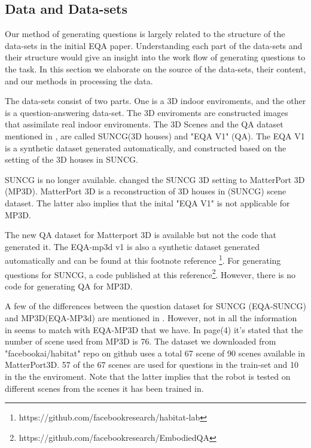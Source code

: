 %
%
%
%



\subsection{Data and Data-sets}

 Our method of generating questions is largely related to the structure of the data-sets in the initial EQA paper\cite{embodiedqa}. Understanding each part of the data-sets and their structure would give an insight into the work flow of generating questions to the task. In this section we elaborate on the source of the data-sets, their content, and our methods in processing the data. 
 
The data-sets consist of two parts. One is a 3D indoor enviroments, and the other is a question-answering data-set. The 3D enviroments are constructed images that assimilate real indoor enviroments. The 3D Scenes and the QA dataset mentioned in \cite{embodiedqa}, are called SUNCG(3D houses) and "EQA V1" (QA). The EQA V1 is a synthetic dataset generated automatically, and constructed based on the setting of the 3D houses in SUNCG. 

SUNCG is no longer available. \cite{embodiedqa} changed the SUNCG 3D setting to MatterPort 3D (MP3D). MatterPort 3D is a reconstruction of 3D houses in (SUNCG) scene dataset. The latter also implies that the inital "EQA V1" is not applicable for MP3D. 

The new QA dataset for Matterport 3D is available but not the code that generated it. The EQA-mp3d v1 is also a synthetic dataset generated automatically and can be found at this footnote reference \footnote{https://github.com/facebookresearch/habitat-lab}. For generating  questions for SUNCG, a code published at this reference\footnote{https://github.com/facebookresearch/EmbodiedQA}. However, there is no code for generating QA for MP3D. 
 
A few of the differences between the question dataset for SUNCG (EQA-SUNCG) and MP3D(EQA-MP3d) are mentioned in \cite{eqa_matterport}. However, not in all the information in  \cite{eqa_matterport} seems to match with EQA-MP3D that we have. In  \cite{eqa_matterport} page(4) it's stated that the number of scene used from MP3D is 76. The dataset we downloaded from "facebookai/habitat" repo on github uses a total 67 scene of 90 scenes available in MatterPort3D. 57 of the 67 scenes are used for questions in the train-set and 10 in the the enviroment. Note that the latter implies that the robot is tested on different scenes from the scenes it has been trained in. 


